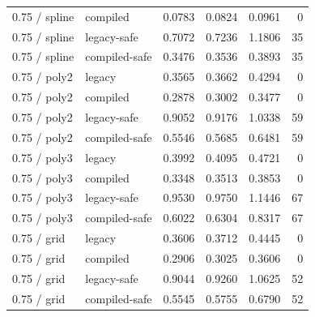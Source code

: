 \begin{longtable}{@{}llrrrr@{}}
0.75 / spline & compiled & 0.0783 & 0.0824 & 0.0961 & 0\\
0.75 / spline & legacy-safe & 0.7072 & 0.7236 & 1.1806 & 35\\
0.75 / spline & compiled-safe & 0.3476 & 0.3536 & 0.3893 & 35\\
0.75 / poly2 & legacy & 0.3565 & 0.3662 & 0.4294 & 0\\
0.75 / poly2 & compiled & 0.2878 & 0.3002 & 0.3477 & 0\\
0.75 / poly2 & legacy-safe & 0.9052 & 0.9176 & 1.0338 & 59\\
0.75 / poly2 & compiled-safe & 0.5546 & 0.5685 & 0.6481 & 59\\
0.75 / poly3 & legacy & 0.3992 & 0.4095 & 0.4721 & 0\\
0.75 / poly3 & compiled & 0.3348 & 0.3513 & 0.3853 & 0\\
0.75 / poly3 & legacy-safe & 0.9530 & 0.9750 & 1.1446 & 67\\
0.75 / poly3 & compiled-safe & 0.6022 & 0.6304 & 0.8317 & 67\\
0.75 / grid & legacy & 0.3606 & 0.3712 & 0.4445 & 0\\
0.75 / grid & compiled & 0.2906 & 0.3025 & 0.3606 & 0\\
0.75 / grid & legacy-safe & 0.9044 & 0.9260 & 1.0625 & 52\\
0.75 / grid & compiled-safe & 0.5545 & 0.5755 & 0.6790 & 52\\
\bottomrule\end{longtable}\endgroup
